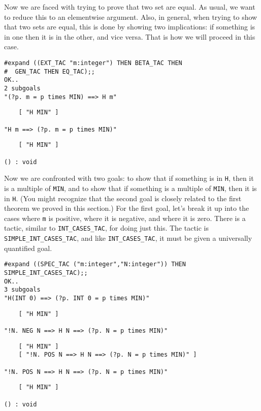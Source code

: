 Now we are faced with trying to prove that two set are equal.  As
usual, we want to reduce this to an elementwise argument.  Also, in
general, when trying to show that two sets are equal, this is done by 
showing two implications: if something is in one then it is in the
other, and vice versa.  That is how we will proceed in this case.
\begin{session}
\begin{verbatim}
#expand ((EXT_TAC "m:integer") THEN BETA_TAC THEN
#  GEN_TAC THEN EQ_TAC);;  
OK..
2 subgoals
"(?p. m = p times MIN) ==> H m"
\end{verbatim}
\mvdots
\begin{verbatim}
    [ "H MIN" ]

"H m ==> (?p. m = p times MIN)"
\end{verbatim}
\mvdots
\begin{verbatim}
    [ "H MIN" ]

() : void
\end{verbatim}
\end{session}

Now we are confronted with two goals: to show that if something is in
{\small\tt H}, then it is a multiple of {\small\verb+MIN+}, and to
show that if something is a multiple of {\small\verb+MIN+}, then it is
in {\small\tt H}.  (You might recognize that the second goal is
closely related to the first theorem we proved in this section.)  For
the first goal, let's break it up into the cases where {\small\tt m}
is positive, where it is negative, and where it is zero.  There is a
tactic, similar to {\small\verb+INT_CASES_TAC+}, for doing just this.
The tactic is {\small\verb+SIMPLE_INT_CASES_TAC+}, and like
{\small\verb+INT_CASES_TAC+}, it must be given a universally quantified
goal. 
\begin{session}
\begin{verbatim}
#expand ((SPEC_TAC ("m:integer","N:integer")) THEN SIMPLE_INT_CASES_TAC);;
OK..
3 subgoals
"H(INT 0) ==> (?p. INT 0 = p times MIN)"
\end{verbatim}
\mvdots
\begin{verbatim}
    [ "H MIN" ]

"!N. NEG N ==> H N ==> (?p. N = p times MIN)"
\end{verbatim}
\mvdots
\begin{verbatim}
    [ "H MIN" ]
    [ "!N. POS N ==> H N ==> (?p. N = p times MIN)" ]

"!N. POS N ==> H N ==> (?p. N = p times MIN)"
\end{verbatim}
\mvdots
\begin{verbatim}
    [ "H MIN" ]

() : void
\end{verbatim}
\end{session}

